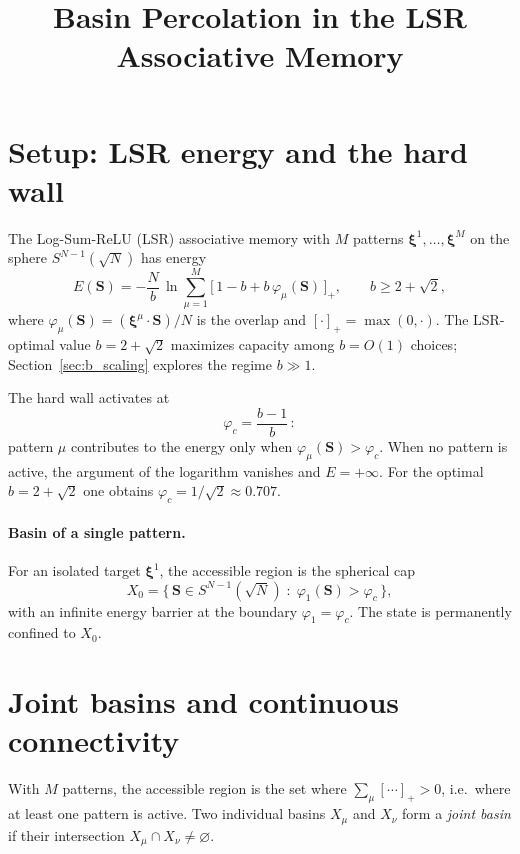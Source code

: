 \documentclass[11pt]{article}
\title{Basin Percolation in the LSR Associative Memory}
\author{}
\date{}
\newcommand{\vp}{\varphi}
\newcommand{\bS}{\mathbf{S}}
\newcommand{\bxi}{\boldsymbol{\xi}}
\begin{document}
\maketitle

\section{Setup: LSR energy and the hard wall}

The Log-Sum-ReLU (LSR) associative memory with $M$ patterns
$\bxi^1, \dots, \bxi^M$ on the sphere $S^{N-1}(\sqrt{N})$
has energy
\begin{equation}\label{eq:E_LSR}
  E(\bS) = -\frac{N}{b}\,\ln \sum_{\mu=1}^{M}
    \bigl[\,1 - b + b\,\vp_\mu(\bS)\,\bigr]_+,
  \qquad b \ge 2 + \sqrt{2},
\end{equation}
where $\vp_\mu(\bS) = (\bxi^\mu \cdot \bS)/N$ is the overlap
and $[\cdot]_+ = \max(0, \cdot)$.
The LSR-optimal value $b = 2 + \sqrt{2}$ maximizes
capacity among $b = O(1)$ choices; Section~\ref{sec:b_scaling}
explores the regime $b \gg 1$.

The hard wall activates at
\begin{equation}\label{eq:phic}
  \vp_c = \frac{b-1}{b}\,:
\end{equation}
pattern $\mu$ contributes to the energy only when
$\vp_\mu(\bS) > \vp_c$.  When no pattern is active, the argument
of the logarithm vanishes and $E = +\infty$.
For the optimal $b = 2 + \sqrt{2}$ one obtains
$\vp_c = 1/\sqrt{2} \approx 0.707$.

\paragraph{Basin of a single pattern.}
For an isolated target $\bxi^1$, the accessible region is the
spherical cap
\begin{equation}\label{eq:basin}
  X_0 = \bigl\{\, \bS \in S^{N-1}(\sqrt{N})
    \;:\; \vp_1(\bS) > \vp_c \,\bigr\},
\end{equation}
with an infinite energy barrier at the boundary $\vp_1 = \vp_c$.
The state is permanently confined to $X_0$.


\section{Joint basins and continuous connectivity}

With $M$ patterns, the accessible region is the set where
$\sum_\mu [\cdots]_+ > 0$, i.e.\ where at least one pattern
is active.  Two individual basins $X_\mu$ and $X_\nu$ form a
\emph{joint basin} if their intersection
$X_\mu \cap X_\nu \neq \varnothing$.
\end{document}
